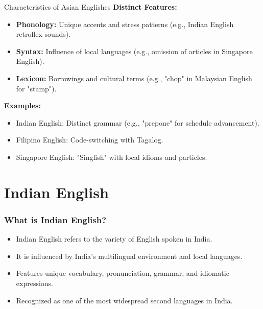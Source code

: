 \documentclass{beamer}
\begin{document}
\begin{frame}{Characteristics of Asian Englishes}
\textbf{Distinct Features:}
\begin{itemize}
    \item \textbf{Phonology:} Unique accents and stress patterns (e.g., Indian English retroflex sounds).
    \item \textbf{Syntax:} Influence of local languages (e.g., omission of articles in Singapore English).
    \item \textbf{Lexicon:} Borrowings and cultural terms (e.g., "chop" in Malaysian English for "stamp").
\end{itemize}

\textbf{Examples:}
\begin{itemize}
    \item Indian English: Distinct grammar (e.g., "prepone" for schedule advancement).
    \item Filipino English: Code-switching with Tagalog.
    \item Singapore English: "Singlish" with local idioms and particles.
\end{itemize}
\end{frame}

\section{Indian English}

\begin{frame}
\frametitle{What is Indian English?}
\begin{itemize}
    \item Indian English refers to the variety of English spoken in India.
    \item It is influenced by India's multilingual environment and local languages.
    \item Features unique vocabulary, pronunciation, grammar, and idiomatic expressions.
    \item Recognized as one of the most widespread second languages in India.
\end{itemize}
\end{frame}
\end{document}
